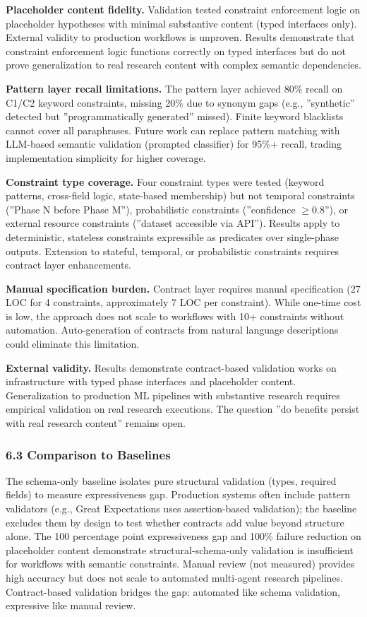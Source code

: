 \textbf{Placeholder content fidelity.} Validation tested constraint enforcement logic on placeholder hypotheses with minimal substantive content (typed interfaces only). External validity to production workflows is unproven. Results demonstrate that constraint enforcement logic functions correctly on typed interfaces but do not prove generalization to real research content with complex semantic dependencies.

\textbf{Pattern layer recall limitations.} The pattern layer achieved 80\% recall on C1/C2 keyword constraints, missing 20\% due to synonym gaps (e.g., ''synthetic'' detected but ''programmatically generated'' missed). Finite keyword blacklists cannot cover all paraphrases. Future work can replace pattern matching with LLM-based semantic validation (prompted classifier) for 95\%+ recall, trading implementation simplicity for higher coverage.

\textbf{Constraint type coverage.} Four constraint types were tested (keyword patterns, cross-field logic, state-based membership) but not temporal constraints (''Phase N before Phase M''), probabilistic constraints (''confidence $\geq 0.8$''), or external resource constraints (''dataset accessible via API''). Results apply to deterministic, stateless constraints expressible as predicates over single-phase outputs. Extension to stateful, temporal, or probabilistic constraints requires contract layer enhancements.

\textbf{Manual specification burden.} Contract layer requires manual specification (27 LOC for 4 constraints, approximately 7 LOC per constraint). While one-time cost is low, the approach does not scale to workflows with 10+ constraints without automation. Auto-generation of contracts from natural language descriptions could eliminate this limitation.

\textbf{External validity.} Results demonstrate contract-based validation works on infrastructure with typed phase interfaces and placeholder content. Generalization to production ML pipelines with substantive research requires empirical validation on real research executions. The question ''do benefits persist with real research content'' remains open.

\subsubsection{6.3 Comparison to Baselines}

The schema-only baseline isolates pure structural validation (types, required fields) to measure expressiveness gap. Production systems often include pattern validators (e.g., Great Expectations uses assertion-based validation); the baseline excludes them by design to test whether contracts add value beyond structure alone. The 100 percentage point expressiveness gap and 100\% failure reduction on placeholder content demonstrate structural-schema-only validation is insufficient for workflows with semantic constraints. Manual review (not measured) provides high accuracy but does not scale to automated multi-agent research pipelines. Contract-based validation bridges the gap: automated like schema validation, expressive like manual review.

